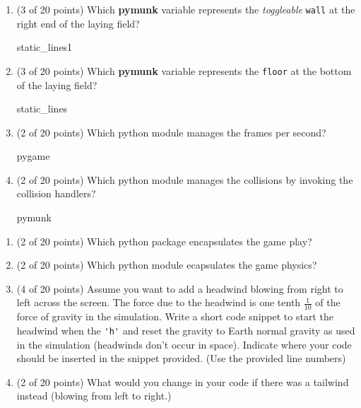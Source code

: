 \documentclass[10pt]{article}
\begin{document}
\begin{enumerate}
\begin{enumerate}
			\item (3 of 20 points) Which \textbf{pymunk} variable represents 
				the \textit{toggleable} \verb|wall| at 
				the right end of the laying field?

				\bigskip
                   		static\_lines1
				\bigskip

			\item (3 of 20 points) Which \textbf{pymunk} variable represents the \verb|floor| at 
				the bottom of the laying field?

				\bigskip
                   		static\_lines
				\bigskip


			\item (2 of 20 points) Which python module manages the frames per second?

				\bigskip
				pygame
				\bigskip

			\item (2 of 20 points) Which python module manages the collisions by invoking the 
				collision handlers?

				\bigskip
				pymunk
				\bigskip
                \end{enumerate}
		\else
		\begin{enumerate}
			\item (2 of 20 points) Which python package encapsulates the game play?
				\bigskip
				\bigskip
				\bigskip
				\bigskip
				\bigskip
				\bigskip
				\bigskip
				\bigskip
				\bigskip
				\bigskip

			\item (2 of 20 points) Which python module ecapsulates the game physics?
				\bigskip
				\bigskip
				\bigskip
				\bigskip
				\bigskip
				\bigskip
				\bigskip
				\bigskip
				\bigskip
				\bigskip

			\item (4 of 20 points) Assume you want to add a headwind blowing from right to left across the 
				screen. The force due to the headwind is one tenth $\frac{1}{10}$ of the 
				force of gravity in the simulation. Write a short code snippet to start the
				headwind when the \verb|'h'| and reset the gravity to Earth normal gravity
				as used in the simulation (headwinds don't occur in space).
				Indicate where your code should be inserted in the snippet provided. (Use the
				provided line numbers)
				\bigskip
				\bigskip
				\bigskip
				\bigskip
				\bigskip
				\bigskip
				\bigskip
				\bigskip
				\bigskip
				\bigskip
			
			\item (2 of 20 points) What would you change in your code if there was a tailwind instead (blowing 
				from left to right.)
				\bigskip
				\bigskip
				\bigskip
				\bigskip
				\bigskip
				\bigskip
				\bigskip
				\bigskip
				\bigskip
				\bigskip


\end{enumerate}
\end{enumerate}
\end{document}
